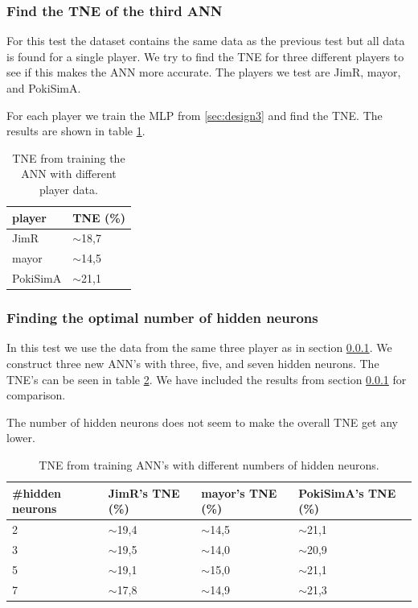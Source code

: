 \subsubsection{Find the TNE of the third ANN}
\label{sec:ann-test3}
For this test the dataset contains the same data as the previous test but all data is found for a single player. We try to find the TNE for three different players to see if this makes the ANN more accurate. The players we test are JimR, mayor, and PokiSimA.

For each player we train the MLP from \ref{sec:design3} and find the TNE. The results are shown in table \ref{tab:tneg3}.

\vspace{4mm}
\begin{table}[H]
\center
\begin{tabular}{ | l | l |}
  \hline
  player & TNE (\%) \\
  \hline
  JimR & $\sim$18,7 \\
  mayor & $\sim$14,5 \\
  PokiSimA & $\sim$21,1 \\
  \hline
\end{tabular}
\caption{TNE from training the ANN with different player data.\label{tab:tneg3}}
\end{table}
\vspace{4mm}

\subsubsection{Finding the optimal number of hidden neurons}
\label{sec:ann-test4}

In this test we use the data from the same three player as in section \ref{sec:ann-test3}. We construct three new ANN's with three, five, and seven hidden neurons. The TNE's can be seen in table \ref{tab:tneg4}. We have included the results from section \ref{sec:ann-test3} for comparison. 

The number of hidden neurons does not seem to make the overall TNE get any lower.

\vspace{4mm}
\begin{table}[H]
\center
\begin{tabular}{ | l | l | l | l | }
  \hline
  \#hidden neurons & JimR's TNE (\%) & mayor's TNE (\%) & PokiSimA's TNE (\%) \\
  \hline
  2 & $\sim$19,4 & $\sim$14,5 & $\sim$21,1 \\
  3 & $\sim$19,5 & $\sim$14,0 & $\sim$20,9 \\
  5 & $\sim$19,1 & $\sim$15,0 & $\sim$21,1 \\
  7 & $\sim$17,8 & $\sim$14,9 & $\sim$21,3 \\
  \hline
\end{tabular}
\caption{TNE from training ANN's with different numbers of hidden neurons.\label{tab:tneg4}}
\end{table}
\vspace{4mm}

